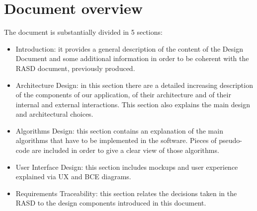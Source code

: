 \section{Document overview}
The document is substantially divided in 5 sections:
\begin{itemize}
\item Introduction: it provides a general description of the content of the Design Document and some additional information in order to be coherent with the RASD document, previously produced.
\item Architecture Design: in this section there are a detailed increasing description of the components of our application, of their architecture and of their internal and external interactions.
This section also explains the main design and architectural choices.
\item Algorithms Design: this section contains an explanation of the main algorithms that have to be implemented in the software.
Pieces of pseudo-code are included in order to give a clear view of those algorithms.
\item User Interface Design: this section includes mockups and user experience explained via UX and BCE diagrams.
\item Requirements Traceability: this section relates the decisions taken in the RASD to the design components introduced in this document.
\end{itemize}
